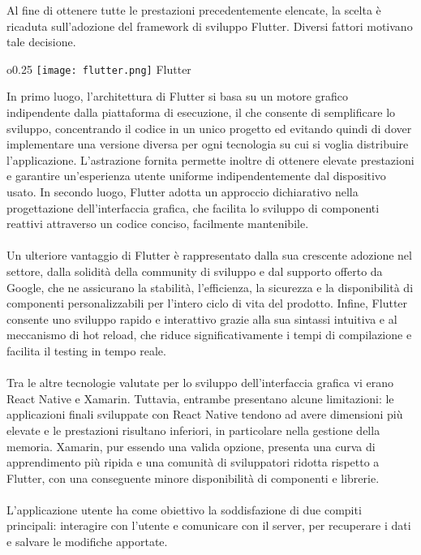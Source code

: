 Al fine di ottenere tutte le prestazioni precedentemente elencate,
la scelta è ricaduta sull'adozione del framework di sviluppo Flutter.
Diversi fattori motivano tale decisione. \\
\begin{wrapfigure}{o}{0.25\textwidth}
    \centering
    \texttt{[image: flutter.png]}
    Flutter
\end{wrapfigure}
In primo luogo, l'architettura di Flutter si basa su un motore grafico
indipendente dalla piattaforma di esecuzione,
il che consente di semplificare lo sviluppo,
concentrando il codice in un unico progetto ed
evitando quindi di dover implementare una versione diversa
per ogni tecnologia su cui si voglia distribuire l'applicazione.
L'astrazione fornita permette inoltre di ottenere elevate prestazioni e
garantire un'esperienza utente uniforme indipendentemente dal dispositivo usato.
In secondo luogo, Flutter adotta un approccio dichiarativo 
nella progettazione dell'interfaccia grafica,
che facilita lo sviluppo di componenti reattivi attraverso un codice conciso, 
facilmente mantenibile.\\
\\
Un ulteriore vantaggio di Flutter è rappresentato dalla sua crescente adozione nel settore,
dalla solidità della community di sviluppo e dal supporto offerto da Google,
che ne assicurano la stabilità, l'efficienza, la sicurezza e la disponibilità
di componenti personalizzabili per l'intero ciclo di vita del prodotto.
Infine, Flutter consente uno sviluppo rapido e interattivo
grazie alla sua sintassi intuitiva e al meccanismo di hot reload,
che riduce significativamente i tempi di compilazione e facilita il testing in tempo reale.\\
\\
Tra le altre tecnologie valutate per lo sviluppo dell'interfaccia grafica vi erano React Native e Xamarin.
Tuttavia, entrambe presentano alcune limitazioni:
le applicazioni finali sviluppate con React Native tendono ad avere dimensioni più elevate e
le prestazioni risultano inferiori,
in particolare nella gestione della memoria.
Xamarin, pur essendo una valida opzione, presenta una curva di apprendimento più ripida e
una comunità di sviluppatori ridotta rispetto a Flutter,
con una conseguente minore disponibilità di componenti e librerie.\\
\\
L'applicazione utente ha come obiettivo la soddisfazione di due compiti principali:
interagire con l'utente e comunicare con il server,
per recuperare i dati e salvare le modifiche apportate.

